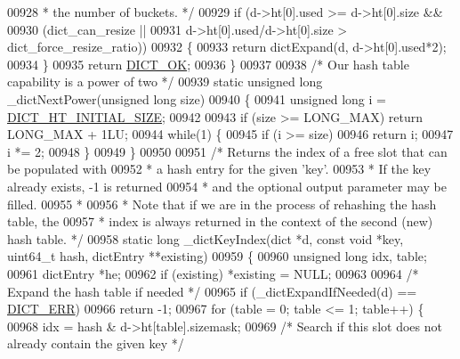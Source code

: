 \begin{DoxyCode}
00928 \textcolor{comment}{     * the number of buckets. */}
00929     \textcolor{keywordflow}{if} (d->ht[0].used >= d->ht[0].size &&
00930         (dict\_can\_resize ||
00931          d->ht[0].used/d->ht[0].size > dict\_force\_resize\_ratio))
00932     \{
00933         \textcolor{keywordflow}{return} dictExpand(d, d->ht[0].used*2);
00934     \}
00935     \textcolor{keywordflow}{return} \hyperlink{dict_8h_a2afecbeab8f7efbc183048f52f6d17e5}{DICT\_OK};
00936 \}
00937 
00938 \textcolor{comment}{/* Our hash table capability is a power of two */}
00939 \textcolor{keyword}{static} \textcolor{keywordtype}{unsigned} \textcolor{keywordtype}{long} \_dictNextPower(\textcolor{keywordtype}{unsigned} \textcolor{keywordtype}{long} size)
00940 \{
00941     \textcolor{keywordtype}{unsigned} \textcolor{keywordtype}{long} i = \hyperlink{dict_8h_aff97c19d1616cf2c697573ee3f515692}{DICT\_HT\_INITIAL\_SIZE};
00942 
00943     \textcolor{keywordflow}{if} (size >= LONG\_MAX) \textcolor{keywordflow}{return} LONG\_MAX + 1LU;
00944     \textcolor{keywordflow}{while}(1) \{
00945         \textcolor{keywordflow}{if} (i >= size)
00946             \textcolor{keywordflow}{return} i;
00947         i *= 2;
00948     \}
00949 \}
00950 
00951 \textcolor{comment}{/* Returns the index of a free slot that can be populated with}
00952 \textcolor{comment}{ * a hash entry for the given 'key'.}
00953 \textcolor{comment}{ * If the key already exists, -1 is returned}
00954 \textcolor{comment}{ * and the optional output parameter may be filled.}
00955 \textcolor{comment}{ *}
00956 \textcolor{comment}{ * Note that if we are in the process of rehashing the hash table, the}
00957 \textcolor{comment}{ * index is always returned in the context of the second (new) hash table. */}
00958 \textcolor{keyword}{static} \textcolor{keywordtype}{long} \_dictKeyIndex(dict *d, \textcolor{keyword}{const} \textcolor{keywordtype}{void} *key, uint64\_t hash, dictEntry **existing)
00959 \{
00960     \textcolor{keywordtype}{unsigned} \textcolor{keywordtype}{long} idx, table;
00961     dictEntry *he;
00962     \textcolor{keywordflow}{if} (existing) *existing = NULL;
00963 
00964     \textcolor{comment}{/* Expand the hash table if needed */}
00965     \textcolor{keywordflow}{if} (\_dictExpandIfNeeded(d) == \hyperlink{dict_8h_a6ce31f31f044b1570d335e8fa0c388c6}{DICT\_ERR})
00966         \textcolor{keywordflow}{return} -1;
00967     \textcolor{keywordflow}{for} (table = 0; table <= 1; table++) \{
00968         idx = hash & d->ht[table].sizemask;
00969         \textcolor{comment}{/* Search if this slot does not already contain the given key */}

\end{DoxyCode}
